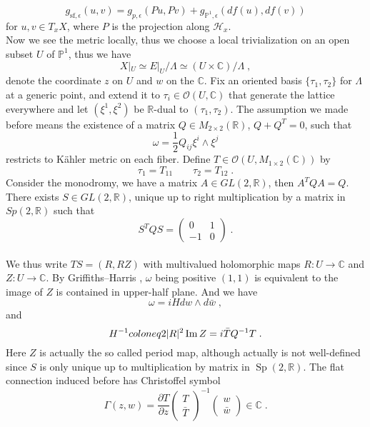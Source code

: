 \[ g_{\mathrm{sf},\epsilon}(u,v)=g_{p,\epsilon}(Pu,Pv)+g_{\mathbb{P}^1,\epsilon}(df(u),df(v)) \]
for $u,v\in T_xX$, where $P$ is the projection along $\mathscr{H}_x$.\\ \indent
Now we see the metric locally, thus we choose a local trivialization on an open subset $U$ of $\mathbb{P}^1$, thus we have
\[ X|_U\simeq E|_U/\Lambda \simeq(U\times \mathbb{C})/\Lambda \; , \]
denote the coordinate $z$ on $U$ and $w$ on the $\mathbb{C}$.
Fix an oriented basis $\{\tau_1,\tau_2\}$ for $\Lambda$ at a generic point, and extend it to $\tau_i\in \mathscr{O}(U,\mathbb{C})$ that generate the lattice everywhere and let $(\xi^1,\xi^2)$ be $\mathbb{R}$-dual to $(\tau_1,\tau_2)$. The assumption we made before means the existence of a matrix $Q\in M_{2\times2}(\mathbb{R})$, $Q+Q^T=0$, such that
\[ \omega=\frac{1}{2}Q_{ij}\xi^i\wedge\xi^j \]
restricts to K{\"a}hler metric on each fiber. Define $T\in \mathscr{O}(U,M_{1\times2}(\mathbb{C}))$ by
\[ \tau_1=T_{11}\qquad \tau_2=T_{12}\; . \]
\indent Consider the monodromy, we have a matrix $A\in GL(2,\mathbb{R})$, then $A^TQA=Q$. There exists $S\in GL(2,\mathbb{R})$, unique up to right multiplication by a matrix in $Sp(2,\mathbb{R})$ such that \[S^TQS=\begin{pmatrix}
0 & 1\\
-1 & 0
\end{pmatrix}\; .\]
\\ \indent We thus write $TS=(R,RZ)$ with multivalued holomorphic maps $R\colon U\rightarrow \mathbb{C}$ and $Z\colon U\rightarrow \mathbb{C}$. By Griffiths--Harris \cite{griffiths1978principles}, $\omega$ being positive $(1,1)$ is equivalent to the image of $Z$ is contained in upper-half plane. And we have
\[ \omega=iH dw\wedge d\bar{w}\; , \]
and
\[ H^{-1}\\coloneq 2|R|^2\operatorname{Im}  Z=i\bar{T}Q^{-1}T\; . \]
\indent Here $Z$ is actually the so called period map, although actually is not well-defined since $S$ is only unique up to multiplication by matrix in $\operatorname{Sp}(2,\mathbb{R})$. The flat connection induced before has Christoffel symbol
\[\Gamma(z,w)=\frac{\partial T}{\partial z}\begin{pmatrix}
T \\
\bar{T}
\end{pmatrix}^{-1}\begin{pmatrix}
w\\
\bar{w}
\end{pmatrix}\in\mathbb{C}\; .\]

